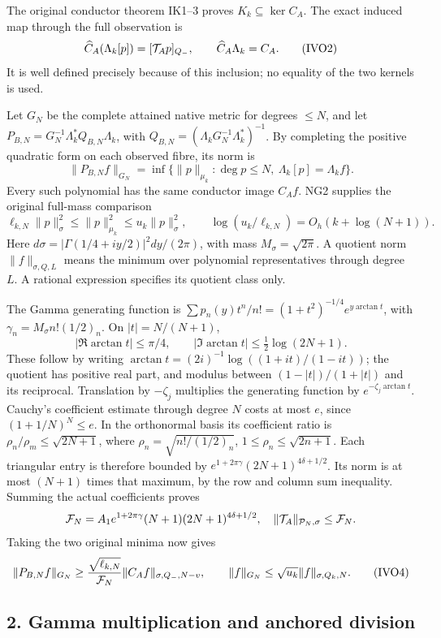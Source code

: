 \documentclass[11pt]{article}
\begin{document}
The original conductor theorem IK1--3 proves \(K_k\subseteq\ker C_A\). The exact induced map through the full observation is \[
\widehat C_A(\Lambda_k[p])=[{\cal T}_Ap]_{Q_-},\qquad
\widehat C_A\Lambda_k=C_A.
\tag{IVO2}
\] It is well defined precisely because of this inclusion; no equality of the two kernels is used.

Let \(G_N\) be the complete attained native metric for degrees \(\le N\), and let \(P_{B,N}=G_N^{-1}\Lambda_k^*Q_{B,N}\Lambda_k\), with \(Q_{B,N}=(\Lambda_kG_N^{-1}\Lambda_k^*)^{-1}\). By completing the positive quadratic form on each observed fibre, its norm is \[
\|P_{B,N}f\|_{G_N}
=\inf\{\|p\|_{\mu_k}:\deg p\le N,\ \Lambda_k[p]=\Lambda_kf\}.
\] Every such polynomial has the same conductor image \(C_Af\). NG2 supplies the original full-mass comparison \[
\ell_{k,N}\|p\|_\sigma^2\le\|p\|_{\mu_k}^2\le u_k\|p\|_\sigma^2,\qquad
\log(u_k/\ell_{k,N})=O_h(k+\log(N+1)).
\tag{IVO3}
\] Here \(d\sigma=|\Gamma(1/4+iy/2)|^2dy/(2\pi)\), with mass \(M_\sigma=\sqrt{2\pi}\). A quotient norm \(\|f\|_{\sigma,Q,L}\) means the minimum over polynomial representatives through degree \(L\). A rational expression specifies its quotient class only.

The Gamma generating function is \(\sum p_n(y)t^n/n!=(1+t^2)^{-1/4}e^{y\arctan t}\), with \(\gamma_n=M_\sigma n!(1/2)_n\). On \(|t|=N/(N+1)\), \[
|\Re\arctan t|\le\pi/4,\qquad
|\Im\arctan t|\le\tfrac12\log(2N+1).
\] These follow by writing \(\arctan t=(2i)^{-1}\log((1+it)/(1-it))\); the quotient has positive real part, and modulus between \((1-|t|)/(1+|t|)\) and its reciprocal. Translation by \(-\zeta_j\) multiplies the generating function by \(e^{-\zeta_j\arctan t}\). Cauchy's coefficient estimate through degree \(N\) costs at most \(e\), since \((1+1/N)^N\le e\). In the orthonormal basis its coefficient ratio is \(\rho_n/\rho_m\le\sqrt{2N+1}\), where \(\rho_n=\sqrt{n!/(1/2)_n}\), \(1\le\rho_n\le\sqrt{2n+1}\). Each triangular entry is therefore bounded by \(e^{1+2\pi\gamma}(2N+1)^{4\delta+1/2}\). Its norm is at most \((N+1)\) times that maximum, by the row and column sum inequality. Summing the actual coefficients proves \[
{\cal F}_N=A_1e^{1+2\pi\gamma}(N+1)(2N+1)^{4\delta+1/2},\quad
\|{\cal T}_A\|_{\mathcal P_N,\sigma}\le{\cal F}_N.
\] Taking the two original minima now gives \[
\|P_{B,N}f\|_{G_N}\ge
\frac{\sqrt{\ell_{k,N}}}{{\cal F}_N}\|C_Af\|_{\sigma,Q_-,N-v},
\qquad
\|f\|_{G_N}\le\sqrt{u_k}\|f\|_{\sigma,Q_k,N}.
\tag{IVO4}
\]

\subsection{2. Gamma multiplication and anchored division}\label{gamma-multiplication-and-anchored-division}
\end{document}
